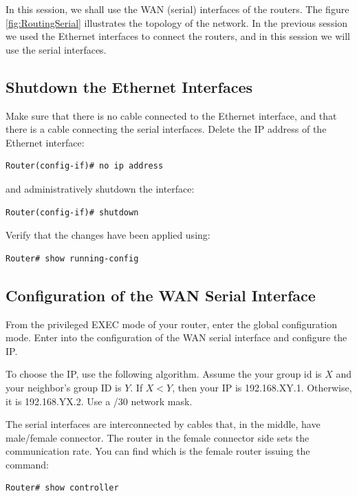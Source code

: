 In this session, we shall use the WAN (serial) interfaces of the routers. The figure \ref{fig:RoutingSerial} illustrates the topology of the network. In the previous session we used the Ethernet interfaces to connect the routers, and in this session we will use the serial interfaces.

\subsection{Shutdown the Ethernet Interfaces}

Make sure that there is no cable connected to the Ethernet interface, and that there is a cable connecting the serial interfaces. Delete the IP address of the Ethernet interface:

\begin{lstlisting}
Router(config-if)# no ip address
\end{lstlisting}

and administratively shutdown the interface:

\begin{lstlisting}
Router(config-if)# shutdown
\end{lstlisting}

Verify that the changes have been applied using:

\begin{lstlisting}
Router# show running-config
\end{lstlisting}

\subsection{Configuration of the WAN Serial Interface}

From the privileged EXEC mode of your router, enter the global configuration mode. Enter into the configuration of the WAN serial interface and configure the IP.

To choose the IP, use the following algorithm. Assume the your group id is $X$ and your neighbor's group ID is $Y$. If $X<Y$, then your IP is 192.168.XY.1. Otherwise, it is 192.168.YX.2. Use a /30 network mask.

The serial interfaces are interconnected by cables that, in the middle, have male/female connector. The router in the female connector side sets the communication rate. You can find which is the female router issuing the command:

\begin{lstlisting}
Router# show controller
\end{lstlisting}

